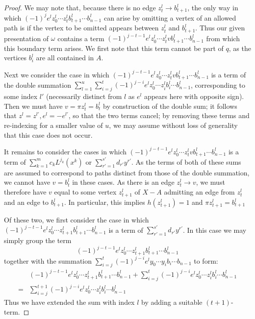 \begin{proof}
We may note that, because there is no edge $z^l_t \to b^l_{t+1}$, the only way in which $(-1)^{j} e^l z^l_0 \cdots z^l_t b^l_{t+1} \cdots b^l_{n-1}$ can arise by omitting a vertex of an allowed path is if the vertex to be omitted appears between $z^l_t$ and $b^l_{t+1}$. Thus our given presentation of $\omega$ contains a term $(-1)^{j-t-1} e^l z^l_0 \cdots z^l_t v b^l_{t+1} \cdots b^l_{n-1}$ from which this boundary term arises. We first note that this term cannot be part of $q$, as the vertices $b^l_i$ are all contained in $A$.

Next we consider the case in which $(-1)^{j-t-1} e^l z^l_0 \cdots z^l_t v b^l_{t+1} \cdots b^l_{n-1}$ is a term of the double summation $\sum_{l = 1}^{u} \sum_{i = j}^{t} (-1)^{j-i} e^l z^l_0 \cdots z^l_i b^l_i \cdots b^l_{n-1}$, corresponding to some index $l'$ (necessarily distinct from $l$ as $e^l$ appears here with opposite sign). Then we must have $v = \pi z^l_t = b^l_t$ by construction of the double sum; it follows that $z^l = z^{l'}, e^l = -e^{l'}$, so that the two terms cancel; by removing these terms and re-indexing for a smaller value of $u$, we may assume without loss of generality that this case does not occur.

It remains to consider the cases in which $(-1)^{j-t-1} e^l z^l_0 \cdots z^l_t v b^l_{t+1} \cdots b^l_{n-1}$ is a term of  $\sum_{k=1}^m c_k L^{j_k}(x^k)$ or $\sum_{r' = 1}^{s'} d_{r'} y^{r'}$. As the terms of both of these sums are assumed to correspond to paths distinct from those of the double summation, we cannot have $v = b^l_t$ in these cases. As there is an edge $z^l_t \to v$, we must therefore have $v$ equal to some vertex $z^l_{t+1}$ of $X - A$ admitting an edge from $z^l_t$ and an edge to $b^l_{t+1}$. In particular, this implies $h(z^l_{t+1}) = 1$ and $\pi z^l_{t+1} = b^l_{t+1}$

Of these two, we first consider the case in which $(-1)^{j-t-1} e^l z^l_0 \cdots z^l_{t+1} b^l_{t+1} \cdots b^l_{n-1}$ is a term of $\sum_{r' = 1}^{s'} d_{r'} y^{r'}$. In this case we may simply group the term 
\[(-1)^{j-t-1} e^l z^l_0 \cdots z^l_{t+1} b^l_{t+1} \cdots b^l_{n-1}\]
together with the summation $\sum_{i = j}^{t} (-1)^{j-i} e^l y_0 \cdots y_i b_i \cdots b_{n-1}$ to form: 
\begin{align*}
& (-1)^{j-t-1} e^l z^l_0 \cdots z^l_{t+1} b^l_{t+1} \cdots b^l_{n-1} + \sum_{i = j}^{t} (-1)^{j-i} e^l z^l_0 \cdots z^l_i b^l_i \cdots b^l_{n-1} \\
= & \sum_{i = j}^{t+1} (-1)^{j-i} e^l z^l_0 \cdots z^l_i b^l_i \cdots b^l_{n-1}
\end{align*}
Thus we have extended the sum with index $l$ by adding a suitable $(t+1)$-term.


\end{proof}
